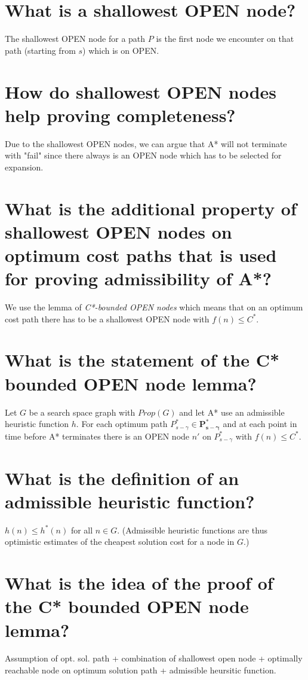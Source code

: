 \documentclass[12pt, a4paper]{article}
\begin{document}
\section{What is a shallowest OPEN node?}
The shallowest OPEN node for a path $P$ is the first node we encounter on that path (starting from $s$) which is on OPEN.

\section{How do shallowest OPEN nodes help proving completeness?}
Due to the shallowest OPEN nodes, we can argue that A* will not terminate with "fail" since there always is an OPEN node which has to be selected for expansion.

\section{What is the additional property of shallowest OPEN nodes on optimum cost paths that is used for proving admissibility of A*?}
We use the lemma of \textit{C*-bounded OPEN nodes} which means that on an optimum cost path there has to be a shallowest OPEN node with $f(n) \leq C^*$. 

\section{What is the statement of the C* bounded OPEN node lemma?}
Let $G$ be a search space graph with $Prop(G)$ and let A* use an admissible heuristic function $h$. For each optimum path $P^{*}_{s-\gamma} \in \boldsymbol{P^*_{s-\gamma}}$ and at each point in time before A* terminates there is an OPEN node $n'$ on $P^{*}_{s-\gamma}$ with $f(n) \leq C^*$. 

\section{What is the definition of an admissible heuristic function?}
$h(n) \leq h^*(n)$ for all $n \in G$. (Admissible heuristic functions are thus optimistic estimates of the cheapest solution cost for a node in $G$.)

\section{What is the idea of the proof of the C* bounded OPEN node lemma?}
Assumption of opt. sol. path + combination of shallowest open node + optimally reachable node on optimum solution path + admissible heursitic function.
\end{document}
